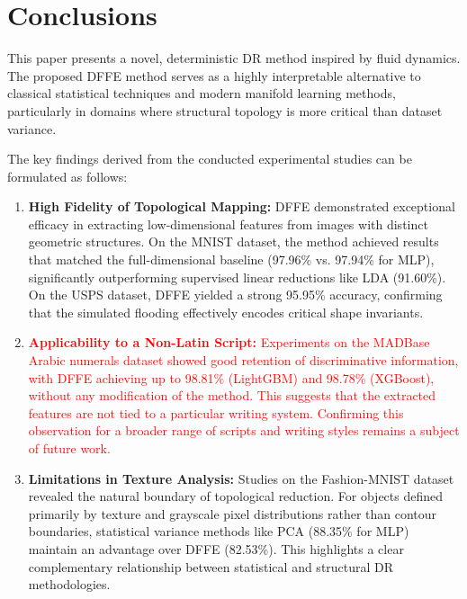 \documentclass[a4paper,fleqn]{cas-dc}
\begin{document}
\section{Conclusions}\label{sec-conclusion}

This paper presents a novel, deterministic DR method inspired by fluid dynamics. The proposed DFFE method serves as a highly interpretable alternative to classical statistical techniques and modern manifold learning methods, particularly in domains where structural topology is more critical than dataset variance.

The key findings derived from the conducted experimental studies can be formulated as follows:

\begin{enumerate}
\item \textbf{High Fidelity of Topological Mapping:} DFFE demonstrated exceptional efficacy in extracting low-dimensional features from images with distinct geometric structures. On the MNIST dataset, the method achieved results that matched the full-dimensional baseline (97.96\% vs. 97.94\% for MLP), significantly outperforming supervised linear reductions like LDA (91.60\%). On the USPS dataset, DFFE yielded a strong 95.95\% accuracy, confirming that the simulated flooding effectively encodes critical shape invariants.

\item \textbf{\textcolor{red}{Applicability to a Non-Latin Script:}} \textcolor{red}{Experiments on the MADBase Arabic numerals dataset showed good retention of discriminative information, with DFFE achieving up to 98.81\% (LightGBM) and 98.78\% (XGBoost), without any modification of the method. This suggests that the extracted features are not tied to a particular writing system. Confirming this observation for a broader range of scripts and writing styles remains a subject of future work.}

\item \textbf{Limitations in Texture Analysis:} Studies on the Fashion-MNIST dataset revealed the natural boundary of topological reduction. For objects defined primarily by texture and grayscale pixel distributions rather than contour boundaries, statistical variance methods like PCA (88.35\% for MLP) maintain an advantage over DFFE (82.53\%). This highlights a clear complementary relationship between statistical and structural DR methodologies.
\end{enumerate}
\end{document}
